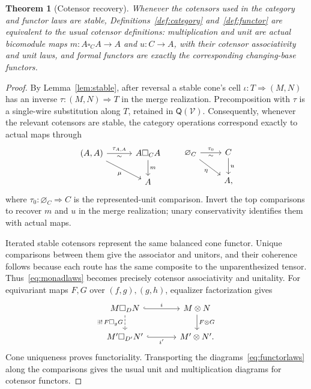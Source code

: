 \documentclass[11pt,a4paper]{article}
\newtheorem{theorem}{Theorem}[section]
\theoremstyle{definition}
\theoremstyle{remark}
\numberwithin{equation}{section}
\newcommand{\V}{\mathcal V}
\newcommand{\Q}{\mathsf Q}
\newcommand{\cell}{\mathrel{\Longrightarrow}}
\newcommand{\emp}[1]{\varnothing_{#1}}
\begin{document}
\begin{theorem}[Cotensor recovery]\label{thm:recovery}
Whenever the cotensors used in the category and functor laws are stable,
Definitions~\ref{def:category} and~\ref{def:functor} are equivalent to the
usual cotensor definitions: multiplication and unit are actual
bicomodule maps $m:A\square_C A\to A$ and $u:C\to A$, with their
cotensor associativity and unit laws, and formal functors are exactly
the corresponding changing-base functors.
\end{theorem}
\begin{proof}
By Lemma~\ref{lem:stable}, after reversal a stable cone's cell
$\iota:T\cell(M,N)$ has an inverse
$\tau:(M,N)\cell T$ in the merge realization. Precomposition with $\tau$
is a single-wire substitution along $T$, retained in $\Q(\V)$.
Consequently, whenever the relevant cotensors are stable, the category
operations correspond exactly to actual maps through
\[
\begin{tikzcd}[column sep=3em]
(A,A) \arrow[r,"\tau_{A,A}","\sim"'] \arrow[dr,"\mu"'] &
A\square_C A \arrow[d,"m"]\\
& A
\end{tikzcd}
\qquad
\begin{tikzcd}
\emp C \arrow[r,"\tau_0","\sim"'] \arrow[dr,"\eta"'] &
C \arrow[d,"u"]\\
& A,
\end{tikzcd}
\]
where $\tau_0:\emp C\cell C$ is the represented-unit comparison.
Invert the top comparisons to recover $m$ and $u$ in the merge
realization; unary conservativity identifies them with actual maps.

Iterated stable cotensors represent the same balanced cone functor.
Unique comparisons between them give the associator and unitors, and
their coherence follows because each route has the same composite to
the unparenthesized tensor. Thus~\eqref{eq:monadlaws} becomes precisely
cotensor associativity and unitality. For equivariant maps $F,G$ over
$(f,g),(g,h)$, equalizer factorization gives
\[
\begin{tikzcd}[column sep=3.5em]
M\square_D N \arrow[r,hook,"i"]
  \arrow[d,dashed,"\exists!\,F\square_g G"'] &
M\otimes N \arrow[d,"F\otimes G"]\\
M'\square_{D'}N' \arrow[r,hook,"i'"'] & M'\otimes N'.
\end{tikzcd}
\]
Cone uniqueness proves functoriality. Transporting
the diagrams~\eqref{eq:functorlaws} along the comparisons gives the
usual unit and multiplication diagrams for cotensor functors.
\end{proof}
\end{document}

